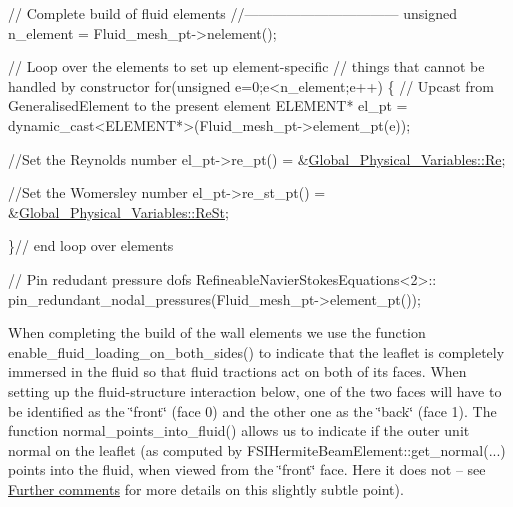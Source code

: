 \begin{DoxyCodeInclude}
 


 \textcolor{comment}{// Complete build of fluid elements}
 \textcolor{comment}{//---------------------------------}
 \textcolor{keywordtype}{unsigned} n\_element = Fluid\_mesh\_pt->nelement();

 \textcolor{comment}{// Loop over the elements to set up element-specific }
 \textcolor{comment}{// things that cannot be handled by constructor}
 \textcolor{keywordflow}{for}(\textcolor{keywordtype}{unsigned} e=0;e<n\_element;e++)
  \{
   \textcolor{comment}{// Upcast from GeneralisedElement to the present element}
   ELEMENT* el\_pt = \textcolor{keyword}{dynamic\_cast<}ELEMENT*\textcolor{keyword}{>}(Fluid\_mesh\_pt->element\_pt(e));

   \textcolor{comment}{//Set the Reynolds number}
   el\_pt->re\_pt() = &\hyperlink{namespaceGlobal__Physical__Variables_ab814e627d2eb5bc50318879d19ab16b9}{Global\_Physical\_Variables::Re};
   
   \textcolor{comment}{//Set the Womersley number}
   el\_pt->re\_st\_pt() = &\hyperlink{namespaceGlobal__Physical__Variables_a085ee4bf968ffdd01a41b8c41864f907}{Global\_Physical\_Variables::ReSt};
      
  \}\textcolor{comment}{// end loop over elements}


 \textcolor{comment}{// Pin redudant pressure dofs}
 RefineableNavierStokesEquations<2>::
  pin\_redundant\_nodal\_pressures(Fluid\_mesh\_pt->element\_pt());

\end{DoxyCodeInclude}


When completing the build of the wall elements we use the function {\ttfamily enable\+\_\+fluid\+\_\+loading\+\_\+on\+\_\+both\+\_\+sides()} to indicate that the leaflet is completely immersed in the fluid so that fluid tractions act on both of its faces. When setting up the fluid-\/structure interaction below, one of the two faces will have to be identified as the \char`\"{}front\char`\"{} (face 0) and the other one as the \char`\"{}back\char`\"{} (face 1). The function {\ttfamily normal\+\_\+points\+\_\+into\+\_\+fluid()} allows us to indicate if the outer unit normal on the leaflet (as computed by {\ttfamily F\+S\+I\+Hermite\+Beam\+Element\+::get\+\_\+normal}(...) points into the fluid, when viewed from the \char`\"{}front\char`\"{} face. Here it does not -- see \hyperlink{index_comm}{Further comments} for more details on this slightly subtle point).


